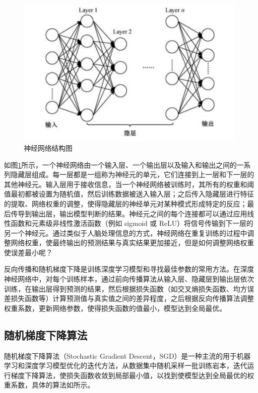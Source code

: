 \begin{figure}[!hbt]
\centering
	\includegraphics[scale=0.5]{fig2/C2/深度神经网络结构图}%
	\caption{神经网络结构图}
	\label{fig:神经网络结构图}	
\end{figure}

如图\ref{fig:神经网络结构图}所示，一个神经网络由一个输入层、一个输出层以及输入和输出之间的一系列隐藏层组成。每一层都是一组称为神经元的单元，它们连接到上一层和下一层的其他神经元。输入层用于接收信息，当一个神经网络被训练时，其所有的权重和阈值最初都被设置为随机值，然后训练数据被送入输入层；之后传入隐藏层进行特征的提取、网络权重的调整，使得隐藏层的神经单元对某种模式形成特定的反应；最后传导到输出层，输出模型判断的结果。神经元之间的每个连接都可以通过应用线性函数和元素级非线性激活函数（例如 sigmoid 或 ReLU）将信号传输到下一层的另一个神经元。通过类似于人脑处理信息的方式，神经网络在重复训练的过程中调整网络权重，使最终输出的预测结果与真实结果更加接近，但是如何调整网络权重使误差最小呢？

反向传播和随机梯度下降是训练深度学习模型和寻找最佳参数的常用方法。在深度神经网络中，对每个训练样本，通过前向传播算法从输入层、隐藏层到输出层依次训练，在输出层得到预测的结果，然后根据损失函数（如交叉熵损失函数、均方误差损失函数等）计算预测值与真实值之间的差异程度，之后根据反向传播算法调整权重系数，更新网络参数，使得损失函数的值最小，模型达到全局最优。

\subsection{随机梯度下降算法}
随机梯度下降算法（Stochastic Gradient Descent，SGD）是一种主流的用于机器学习和深度学习模型优化的迭代方法，从数据集中随机采样一批训练岩本，迭代运行梯度下降算法，使损失函数收敛到局部最小值，以找到使模型达到全局最优的权重系数，具体的算法如所示。

